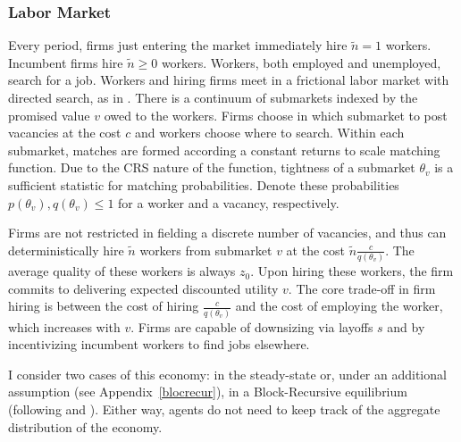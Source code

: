 \subsubsection*{Labor Market}  %
Every period, firms just entering the market immediately hire $\tilde{n}=1$ workers. Incumbent firms hire $\tilde{n}\geq 0$ workers. Workers, both employed and unemployed, search for a job. Workers and hiring firms meet in a frictional labor market with directed search, as in \textcite{moen1997}. There is a continuum of submarkets indexed by the promised value $v$ owed to the workers. Firms choose in which submarket to post vacancies at the cost $c$ and workers choose where to search. Within each submarket, matches are formed according a constant returns to scale matching function. Due to the CRS nature of the function, tightness of a submarket $\theta_v$ is a sufficient statistic for matching probabilities. Denote these probabilities $p(\theta_v),q(\theta_v)\leq 1$ for a worker and a vacancy, respectively. 

Firms are not restricted in fielding a discrete number of vacancies, and thus can deterministically hire $\tilde{n}$ workers from submarket $v$ at the cost $\tilde{n}\frac{c}{q(\theta_v)}$. The average quality of these workers is always $z_0$. Upon hiring these workers, the firm commits to delivering expected discounted utility $v$. The core trade-off in firm hiring is between the cost of hiring $\frac{c}{q(\theta_v)}$ and the cost of employing the worker, which increases with $v$.
Firms are capable of downsizing via layoffs $s$ and by incentivizing incumbent workers to find jobs elsewhere. 

I consider two cases of this economy: in the steady-state or, under an additional assumption (see Appendix~\ref{blocrecur}), in a Block-Recursive equilibrium (following \textcite{menzio2011} and \textcite{schaal2017}). Either way, agents do not need to keep track of the aggregate distribution of the economy.
